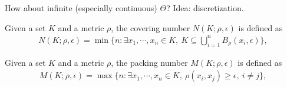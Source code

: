 \documentclass[11pt,letterpaper]{article}
\numberwithin{theorem}{lecture}
\numberwithin{proposition}{lecture}
\numberwithin{lemma}{lecture}
\numberwithin{claim}{lecture}
\numberwithin{corollary}{lecture}
\numberwithin{definition}{lecture}
\numberwithin{conjecture}{lecture}
\numberwithin{remark}{lecture}
\numberwithin{example}{lecture}
\numberwithin{equation}{lecture}
\begin{document}
\bigskip

How about infinite (especially continuous) $\Theta$? Idea: discretization.

\begin{definition}
  Given a set $K$ and a metric $\rho$, the covering number $N (K; \rho, \epsilon)$ is defined as
  \begin{align*}
    N (K; \rho, \epsilon) = \min \Big\{ n: \exists x_1, \cdots, x_n \in K,~ K \subseteq \bigcup_{i = 1}^n B_\rho (x_i, \epsilon) \Big\},
  \end{align*}
\end{definition}

\begin{definition}
  Given a set $K$ and a metric $\rho$, the packing number $M (K; \rho, \epsilon)$ is defined as
  \begin{align*}
    M (K; \rho, \epsilon) = \max \Big\{ n: \exists x_1, \cdots, x_n \in K,~ \rho(x_i, x_j) \geq \epsilon,~ i \neq j\Big\},
  \end{align*}
\end{definition}
\end{document}

